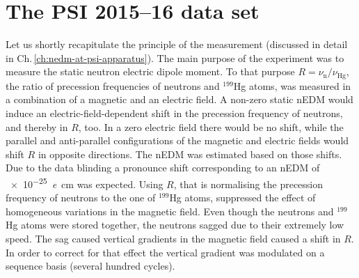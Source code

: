 \section{The PSI 2015--16 data set}
Let us shortly recapitulate the principle of the measurement (discussed in detail in Ch.\,\ref{ch:nedm-at-psi-apparatus}). The main purpose of the experiment was to measure the static neutron electric dipole moment. To that purpose $R = \nu_\text{n} / \nu_\text{Hg}$, the ratio of precession frequencies of neutrons and ${}^{199}$Hg atoms, was measured in a combination of a magnetic and an electric field. A non-zero static nEDM would induce an electric-field-dependent shift in the precession frequency of neutrons, and thereby in $R$, too. In a zero electric field there would be no shift, while the parallel and anti-parallel configurations of the magnetic and electric fields would shift $R$ in opposite directions.
The nEDM was estimated based on those shifts. Due to the data blinding
a pronounce shift corresponding to an nEDM of \SI{e-25}{\elementarycharge\centi\meter} was expected. Using $R$, that is normalising the precession frequency of neutrons to the one of ${}^{199}$Hg atoms, suppressed the effect of homogeneous variations in the magnetic field. Even though the neutrons and ${}^{199}$Hg atoms were stored together, the neutrons sagged due to their extremely low speed. The sag caused vertical gradients in the magnetic field caused a shift in $R$. In order to correct for that effect the vertical gradient was modulated on a sequence basis (several hundred cycles).

